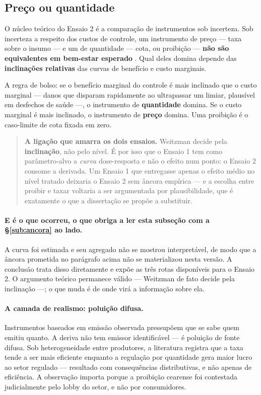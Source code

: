\subsection{Preço ou quantidade}
\label{sub:weitzman}

O núcleo teórico do Ensaio 2 é a comparação de instrumentos sob incerteza. Sob
incerteza a respeito dos custos de controle, um instrumento de preço --- taxa
sobre o insumo --- e um de quantidade --- cota, ou proibição --- \textbf{não são
equivalentes em bem-estar esperado} \citep{weitzman1974}. Qual deles domina
depende das \textbf{inclinações relativas} das curvas de benefício e custo
marginais.

A regra de bolso: se o benefício marginal do controle é mais inclinado que o
custo marginal --- danos que disparam rapidamente ao ultrapassar um limiar,
plausível em desfechos de saúde ---, o instrumento de \textbf{quantidade} domina.
Se o custo marginal é mais inclinado, o instrumento de \textbf{preço} domina. Uma
proibição é o caso-limite de cota fixada em zero.

\begin{quote}
\textbf{A ligação que amarra os dois ensaios.} Weitzman decide pela
\textbf{inclinação}, não pelo nível. É por isso que o Ensaio 1 tem como
parâmetro-alvo a \emph{curva} dose-resposta e não o efeito num ponto: o Ensaio 2
consome a derivada. Um Ensaio 1 que entregasse apenas o efeito médio no nível
tratado deixaria o Ensaio 2 sem âncora empírica --- e a escolha entre proibir e
taxar voltaria a ser argumentada por plausibilidade, que é exatamente o que a
dissertação se propõe a substituir.
\end{quote}

\paragraph{E é o que ocorreu, o que obriga a ler esta subseção com a
§\ref{sub:ancora} ao lado.}
A curva foi estimada e seu agregado não se mostrou interpretável, de modo que a
âncora prometida no parágrafo acima não se materializou nesta versão. A
conclusão trata disso diretamente e expõe as três rotas disponíveis para o
Ensaio 2. O argumento teórico permanece válido --- Weitzman de fato decide pela
inclinação ---; o que muda é de onde virá a informação sobre ela.

\paragraph{A camada de realismo: poluição difusa.} Instrumentos baseados em
emissão observada pressupõem que se sabe quem emitiu quanto. A deriva não tem
emissor identificável --- é poluição de fonte difusa. Sob heterogeneidade entre
produtores, a literatura registra que a taxa tende a ser mais eficiente enquanto
a regulação por quantidade gera maior lucro ao setor regulado
\citep{helfand1995} --- resultado com consequências distributivas, e não apenas
de eficiência. A observação importa porque a proibição cearense foi contestada
judicialmente pelo lobby do setor, e não por consumidores.

